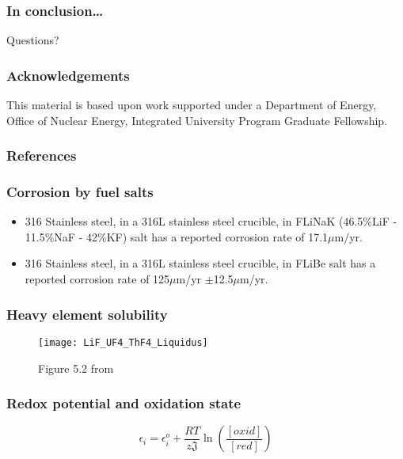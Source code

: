 \documentclass{beamer}
\begin{document}
\begin{frame}
\frametitle{In conclusion\ldots}

    Questions?

\end{frame}

\begin{frame}
\frametitle{Acknowledgements}

    This material is based upon work supported under a Department of Energy,
    Office of Nuclear Energy, Integrated University Program Graduate Fellowship.

\end{frame}

\begin{frame}[allowframebreaks]
\frametitle{References}



\end{frame}

\begin{frame}
\frametitle{Corrosion by fuel salts}

    \begin{itemize}
        \item 316 Stainless steel, in a 316L stainless steel crucible, in FLiNaK (46.5\%LiF - 11.5\%NaF - 42\%KF) salt has a reported corrosion rate of 17.1$\mu$m/yr. \cite{zheng_corrosion_2015}
        \item 316 Stainless steel, in a 316L stainless steel crucible, in FLiBe salt has a reported corrosion rate of 125$\mu$m/yr $\pm$12.5$\mu$m/yr. \cite{sellers_materials_2012}
    \end{itemize}

\end{frame}

\begin{frame}
\frametitle{Heavy element solubility}

    \begin{figure}
        \centering
        \texttt{[image: LiF\_UF4\_ThF4\_Liquidus]}
        \caption{Figure 5.2 from \cite{rosenthal_development_1972}}
        \label{fig:salt_liquidus}
    \end{figure}

\end{frame}

\begin{frame}
\frametitle{Redox potential and oxidation state}

    \begin{equation}
    \label{Nernst}
        \epsilon_{i} = \epsilon_{i}^{o} + \frac{RT}{z\mathfrak{J}}\ln\left(\frac{[oxid]}{[red]}\right)
    \end{equation}

\end{frame}
\end{document}
